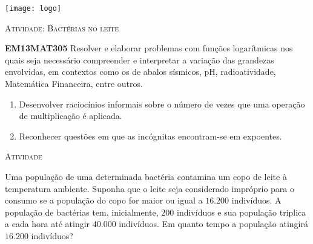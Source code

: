\documentclass[10 pt,usenames,dvipsnames, oneside]{article}
\begin{document}
\begin{center}
  \begin{minipage}[l]{3cm}
\texttt{[image: logo]}    
\end{minipage}\hfill
\begin{minipage}[r]{.8\textwidth}
 {\Large \scshape Atividade: Bactérias no leite}  
\end{minipage}
\end{center}
\vspace{.2cm}

\ifdefined\prof
\begin{objetivos}
\item \textbf{EM13MAT305} Resolver e elaborar problemas com funções logarítmicas nos quais seja necessário compreender e interpretar a variação das grandezas envolvidas, em contextos como os de abalos sísmicos, pH, radioatividade, Matemática Financeira, entre outros.
\end{objetivos}

\begin{goals}
\begin{enumerate}
\item Desenvolver raciocínios informais sobre o número de vezes que uma operação de multiplicação é aplicada.
\item Reconhecer questões em que as incógnitas encontram-se em expoentes.
\end{enumerate}

\end{goals}

\bigskip
\begin{center}
{\large \scshape Atividade}
\end{center}
\fi

Uma população de uma determinada bactéria contamina um copo de leite à temperatura ambiente. Suponha que o leite seja considerado impróprio para o consumo se a população do copo for maior ou igual a $16.200$ indivíduos. A população de bactérias tem, inicialmente, $200$ indivíduos e sua população triplica a cada hora até atingir $40.000$ indivíduos. Em quanto tempo a população atingirá $16.200$ indivíduos?
\end{document}
